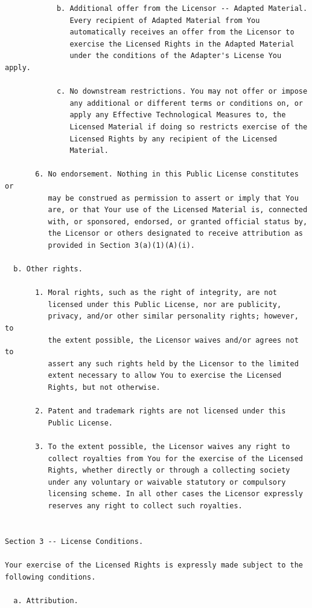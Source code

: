 \documentclass[12pt,spanish,]{article}
\begin{document}
\begin{verbatim}
            b. Additional offer from the Licensor -- Adapted Material.
               Every recipient of Adapted Material from You
               automatically receives an offer from the Licensor to
               exercise the Licensed Rights in the Adapted Material
               under the conditions of the Adapter's License You apply.

            c. No downstream restrictions. You may not offer or impose
               any additional or different terms or conditions on, or
               apply any Effective Technological Measures to, the
               Licensed Material if doing so restricts exercise of the
               Licensed Rights by any recipient of the Licensed
               Material.

       6. No endorsement. Nothing in this Public License constitutes or
          may be construed as permission to assert or imply that You
          are, or that Your use of the Licensed Material is, connected
          with, or sponsored, endorsed, or granted official status by,
          the Licensor or others designated to receive attribution as
          provided in Section 3(a)(1)(A)(i).

  b. Other rights.

       1. Moral rights, such as the right of integrity, are not
          licensed under this Public License, nor are publicity,
          privacy, and/or other similar personality rights; however, to
          the extent possible, the Licensor waives and/or agrees not to
          assert any such rights held by the Licensor to the limited
          extent necessary to allow You to exercise the Licensed
          Rights, but not otherwise.

       2. Patent and trademark rights are not licensed under this
          Public License.

       3. To the extent possible, the Licensor waives any right to
          collect royalties from You for the exercise of the Licensed
          Rights, whether directly or through a collecting society
          under any voluntary or waivable statutory or compulsory
          licensing scheme. In all other cases the Licensor expressly
          reserves any right to collect such royalties.


Section 3 -- License Conditions.

Your exercise of the Licensed Rights is expressly made subject to the
following conditions.

  a. Attribution.


\end{verbatim}
\end{document}
